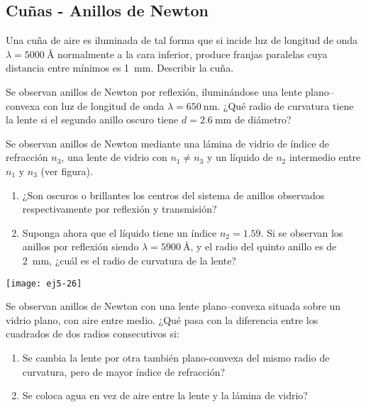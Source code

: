 \subsection*{Cuñas - Anillos de Newton}

\item Una cuña de aire es iluminada de tal forma que si incide luz de longitud de onda \(\lambda = \SI{5000}{\angstrom}\) normalmente a la cara inferior, produce
franjas paralelas cuya distancia entre mínimos es \SI{1}{\milli\metre}.
Describir la cuña. 


\item Se observan anillos de Newton por reflexión, iluminándose una lente plano--convexa con luz de longitud de onda \(\lambda = \SI{650}{\nano\metre}\).
¿Qué radio de curvatura tiene la lente si el segundo anillo oscuro tiene \(d = \SI{2.6}{\milli\metre}\) de diámetro? 



\item
\begin{minipage}[t][4.8cm]{0.65\textwidth}
Se observan anillos de Newton mediante una lámina de vidrio de índice de refracción $n_3$, una lente de vidrio con $n_1 \ne n_3$ y un líquido de $n_2$ intermedio entre $n_1$ y $n_3$ (ver figura). 
\begin{enumerate}
\item ¿Son oscuros o brillantes los centros del sistema de anillos observados respectivamente por reflexión y transmisión? 
\item Suponga ahora que el líquido tiene un índice $n_2 = \num{1.59}$.
Si se observan los anillos por reflexión siendo $\lambda = \SI{5900}{\angstrom}$, y el radio del quinto anillo es de \SI{2}{\milli\metre}, ¿cuál es el radio de curvatura
de la lente?
\end{enumerate}
\end{minipage}
\begin{minipage}[c][0cm][t]{0.3\textwidth}
	\texttt{[image: ej5-26]}
\end{minipage}



\item Se observan anillos de Newton con una lente plano--convexa situada sobre un vidrio plano, con aire entre medio.
¿Qué pasa con la diferencia entre los cuadrados de dos radios consecutivos si: 
\begin{enumerate}
	\item Se cambia la lente por otra también plano-convexa del mismo radio de curvatura, pero de mayor índice de refracción? 
	\item Se coloca agua en vez de aire entre la lente y la lámina de vidrio? 
\end{enumerate}



